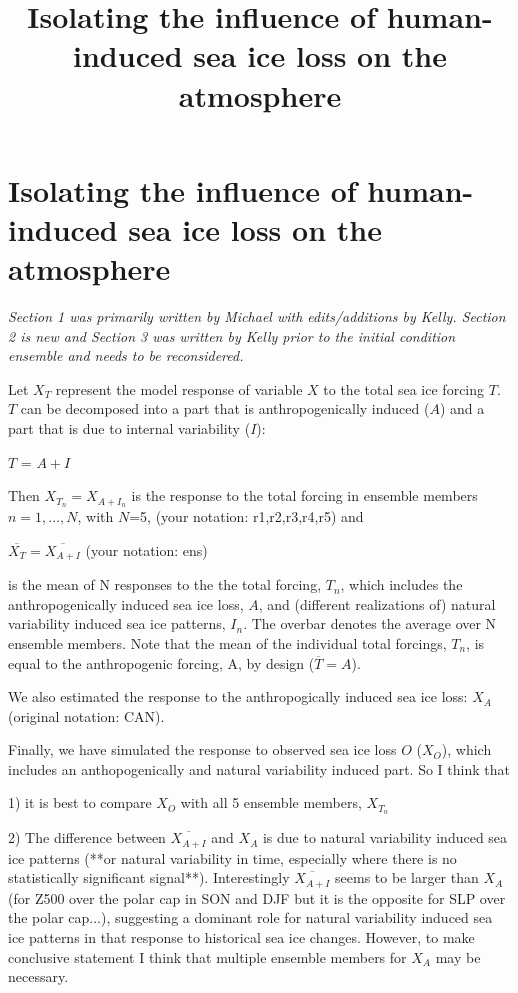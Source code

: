 \documentclass[12pt]{article}
\begin{document}
\title{\bf Isolating the influence of human-induced sea ice loss on the atmosphere}

\section{Isolating the influence of human-induced sea ice loss on the atmosphere}

\textit{Section 1 was primarily written by Michael with edits/additions by Kelly. Section 2 is new and Section 3 was written by Kelly prior to the initial condition ensemble and needs to be reconsidered.}

Let $X_{T}$ represent the model response of variable $X$ to the total sea ice forcing $T$. $T$ can be decomposed into a part that is anthropogenically induced ($A$) and a part that is due to internal variability ($I$):

$T$ = $A +I$ %

Then  $X_{T_{n}} = X_{A+I_{n}}$ is the response to the total forcing in ensemble members $n=1,\ldots,N$, with $N$=5, (your notation: r1,r2,r3,r4,r5) and

$\overline{X_{T}}=\overline{X_{A+I}}$  (your notation: ens)

is the mean of N responses to the the total forcing, $T_n$, which includes the anthropogenically induced sea ice loss, $A$, and (different realizations of) natural variability induced sea ice patterns, $I_n$. The overbar denotes the average over N ensemble members. Note that the mean of the individual total forcings, $T_n$, is equal to the anthropogenic forcing, A, by design ($\overline{T} = A$).

We also estimated the response to the anthropogically induced sea ice loss:
${X_{A}}$ (original notation: CAN). 

Finally, we have simulated the response to observed sea ice loss $O$ (${X_{O}}$), which includes an anthopogenically and natural variability induced part. So I think that

1) it is best to compare ${X_{O}}$ with all 5 ensemble members, $X_{T_{n}}$

2) The difference between $\overline{X_{A+I}}$ and $X_{A}$ is due to natural variability induced sea ice patterns (**or natural variability in time, especially where there is no statistically significant signal**). Interestingly $\overline{X_{A+I}}$ seems to be larger than $X_{A}$ (for Z500 over the polar cap in SON and DJF but it is the opposite for SLP over the polar cap...), suggesting a dominant role for natural variability induced sea ice patterns in that response to historical sea ice changes. However, to make conclusive statement I think that multiple ensemble members for $X_{A}$ may be necessary.
\end{document}
